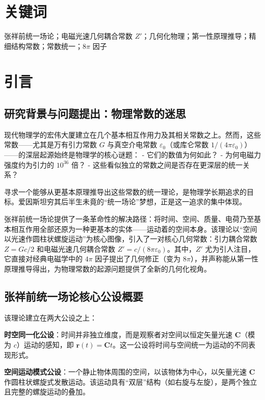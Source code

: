 \documentclass[a4paper,12pt]{article}
\theoremstyle{plain}
\renewcommand{\vec}[1]{\bm{#1}}
\begin{document}
\section*{关键词}
张祥前统一场论；电磁光速几何耦合常数 $Z'$；几何化物理；第一性原理推导；精细结构常数；常数统一；$8\pi$ 因子

\vspace{1cm}

\tableofcontents

\newpage

\section{引言}
\subsection{研究背景与问题提出：物理常数的迷思}
现代物理学的宏伟大厦建立在几个基本相互作用力及其相关常数之上。然而，这些常数——尤其是万有引力常数 $G$ 与真空介电常数 $\varepsilon_0$（或库仑常数 $1/(4\pi\varepsilon_0)$）——的深层起源始终是物理学的核心谜题：
- 它们的数值为何如此？
- 为何电磁力强度约为引力的 $10^{36}$ 倍？
- 这些看似独立的常数之间是否存在更深层的统一关系？

寻求一个能够从更基本原理推导出这些常数的统一理论，是物理学长期追求的目标。爱因斯坦穷其后半生未竟的“统一场论”梦想，正是这一追求的集中体现。

张祥前统一场论提供了一条革命性的解决路径：将时间、空间、质量、电荷乃至基本相互作用全部还原为一种更基本的实体——运动着的空间本身。该理论以“空间以光速作圆柱状螺旋运动”为核心图像，引入了一对核心几何常数：引力耦合常数 $Z = Gc/2$ 和电磁光速几何耦合常数 $Z' = c/(8\pi\varepsilon_0)$。其中，$Z'$ 尤为引人注目，它直接对经典电磁学中的 $4\pi$ 因子提出了几何修正（变为 $8\pi$），并声称能从第一性原理推导得出，为物理常数的起源问题提供了全新的几何化视角。

\subsection{张祥前统一场论核心公设概要}
该理论建立在两大公设之上：

\textbf{时空同一化公设}：时间并非独立维度，而是观察者对空间以恒定矢量光速 $\vec{C}$（模为 $c$）运动的感知，即 $\vec{r}(t) = \vec{C}t$。这一公设将时间与空间统一为运动的不同表现形式。

\textbf{空间运动模式公设}：一个静止物体周围的空间，以该物体为中心，以矢量光速 $\vec{C}$ 作圆柱状螺旋式发散运动。该运动具有“双层”结构（如右旋与左旋），是两个独立且完整的螺旋运动的叠加。
\end{document}
